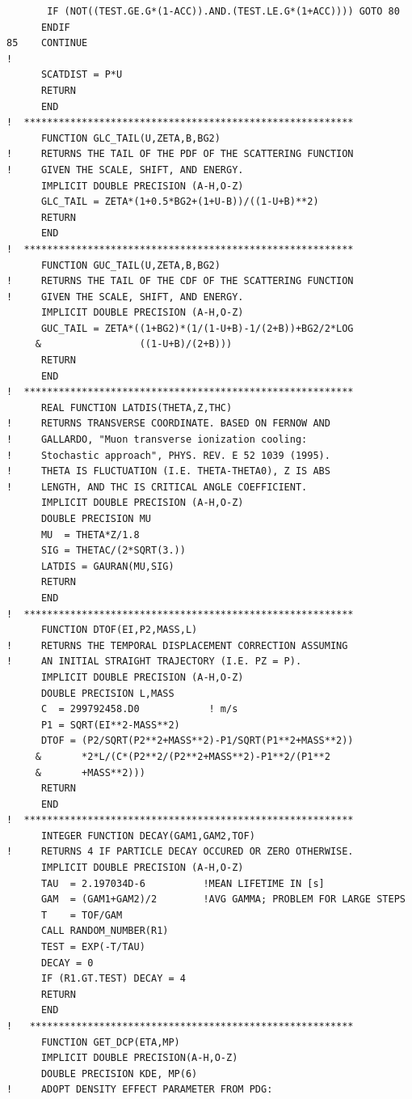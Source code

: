 \begin{lstlisting}
       IF (NOT((TEST.GE.G*(1-ACC)).AND.(TEST.LE.G*(1+ACC)))) GOTO 80
      ENDIF
85    CONTINUE
!
      SCATDIST = P*U
      RETURN
      END
!  *********************************************************
      FUNCTION GLC_TAIL(U,ZETA,B,BG2)
!     RETURNS THE TAIL OF THE PDF OF THE SCATTERING FUNCTION
!     GIVEN THE SCALE, SHIFT, AND ENERGY.
      IMPLICIT DOUBLE PRECISION (A-H,O-Z)
      GLC_TAIL = ZETA*(1+0.5*BG2+(1+U-B))/((1-U+B)**2)
      RETURN
      END
!  *********************************************************
      FUNCTION GUC_TAIL(U,ZETA,B,BG2)
!     RETURNS THE TAIL OF THE CDF OF THE SCATTERING FUNCTION
!     GIVEN THE SCALE, SHIFT, AND ENERGY.
      IMPLICIT DOUBLE PRECISION (A-H,O-Z)
      GUC_TAIL = ZETA*((1+BG2)*(1/(1-U+B)-1/(2+B))+BG2/2*LOG
     &                 ((1-U+B)/(2+B)))
      RETURN
      END      
!  *********************************************************
      REAL FUNCTION LATDIS(THETA,Z,THC)
!     RETURNS TRANSVERSE COORDINATE. BASED ON FERNOW AND
!     GALLARDO, "Muon transverse ionization cooling: 
!     Stochastic approach", PHYS. REV. E 52 1039 (1995).
!     THETA IS FLUCTUATION (I.E. THETA-THETA0), Z IS ABS
!     LENGTH, AND THC IS CRITICAL ANGLE COEFFICIENT.
      IMPLICIT DOUBLE PRECISION (A-H,O-Z)
      DOUBLE PRECISION MU
      MU  = THETA*Z/1.8
      SIG = THETAC/(2*SQRT(3.))
      LATDIS = GAURAN(MU,SIG)
      RETURN
      END
!  *********************************************************
      FUNCTION DTOF(EI,P2,MASS,L)
!     RETURNS THE TEMPORAL DISPLACEMENT CORRECTION ASSUMING
!     AN INITIAL STRAIGHT TRAJECTORY (I.E. PZ = P).
      IMPLICIT DOUBLE PRECISION (A-H,O-Z)
      DOUBLE PRECISION L,MASS
      C  = 299792458.D0            ! m/s
      P1 = SQRT(EI**2-MASS**2)
      DTOF = (P2/SQRT(P2**2+MASS**2)-P1/SQRT(P1**2+MASS**2))
     &       *2*L/(C*(P2**2/(P2**2+MASS**2)-P1**2/(P1**2
     &       +MASS**2)))
      RETURN
      END
!  *********************************************************
      INTEGER FUNCTION DECAY(GAM1,GAM2,TOF)
!     RETURNS 4 IF PARTICLE DECAY OCCURED OR ZERO OTHERWISE.
      IMPLICIT DOUBLE PRECISION (A-H,O-Z)
      TAU  = 2.197034D-6          !MEAN LIFETIME IN [s]
      GAM  = (GAM1+GAM2)/2        !AVG GAMMA; PROBLEM FOR LARGE STEPS
      T    = TOF/GAM
      CALL RANDOM_NUMBER(R1)
      TEST = EXP(-T/TAU)
      DECAY = 0
      IF (R1.GT.TEST) DECAY = 4
      RETURN
      END
!   ********************************************************
      FUNCTION GET_DCP(ETA,MP)
      IMPLICIT DOUBLE PRECISION(A-H,O-Z)
      DOUBLE PRECISION KDE, MP(6)
!     ADOPT DENSITY EFFECT PARAMETER FROM PDG:

\end{lstlisting}
